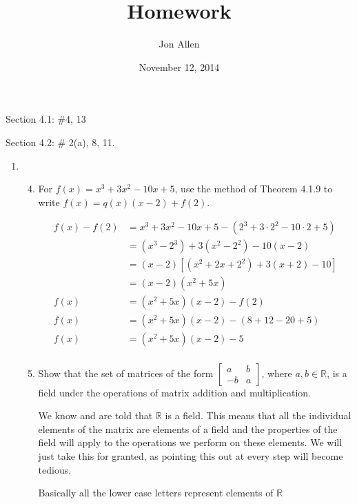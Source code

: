 \documentclass[letterpaper]{article}
\begin{document}
\title{Homework}
\date{November 12, 2014}
\author{Jon Allen}
\maketitle
Section 4.1: \#4, 13

Section 4.2: \# 2(a), 8, 11.
\renewcommand{\labelenumi}{4.\arabic{enumi}}
\renewcommand{\labelenumii}{\arabic{enumii}.}
\renewcommand{\labelenumiii}{(\alph{enumiii})}
\begin{enumerate}
\item
  \begin{enumerate}
  \setcounter{enumii}{3}
  \item
    For $f(x)=x^3+3x^2-10x+5$, use the method of Theorem 4.1.9 to write $f(x)=q(x)(x-2)+f(2)$.

    \begin{align*}
      f(x)-f(2)&=x^3+3x^2-10x+5-(2^3+3\cdot 2^2-10\cdot 2+5)\\
      &=(x^3-2^3)+3(x^2-2^2)-10(x-2)\\
      &=(x-2)[(x^2+2x+2^2)+3(x+2)-10]\\
      &=(x-2)(x^2+5x)\\
      f(x)&=(x^2+5x)(x-2)-f(2)\\
      f(x)&=(x^2+5x)(x-2)-(8+12-20+5)\\
      f(x)&=(x^2+5x)(x-2)-5\\
    \end{align*}
  \setcounter{enumii}{12}
  \item
    Show that the set of matrices of the form $\left[\begin{array}{rr}a&b\\-b&a\end{array}\right]$, where $a,b\in \mathbb{R}$, is a field under the operations of matrix addition and multiplication.

    We know and are told that $\mathbb{R}$ is a field. This means that all the individual elements of the matrix are elements of a field and the properties of the field will apply to the operations we perform on these elements. We will just take this for granted, as pointing this out at every step will become tedious.

    Basically all the lower case letters represent elements of $\mathbb{R}$


\end{enumerate}
\end{enumerate}
\end{document}
